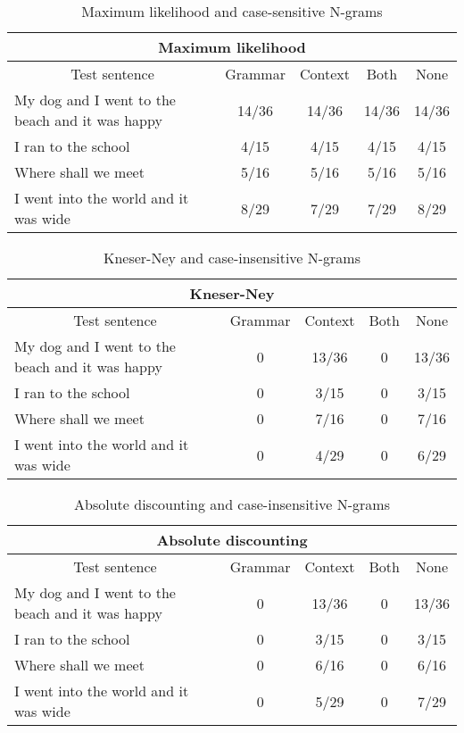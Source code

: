 \vspace{-1cm}
\begin{table}[H]
\centering
\caption{Maximum likelihood and case-sensitive N-grams}
{\scriptsize
\begin{tabular}{ |p{}|c|c|c|c| }
	\hline
	\multicolumn{5}{|c|}{Maximum likelihood} \\
	\hline
	\multicolumn{1}{|c|}{Test sentence} & Grammar & Context & Both & None \\
	\hline
	My dog and I went to the beach and it was happy & 14/36 & 14/36 & 14/36 & 14/36 \\
	\hline
	I ran to the school & 4/15 & 4/15 & 4/15 & 4/15 \\
	\hline
	Where shall we meet & 5/16 & 5/16 & 5/16 & 5/16 \\
	\hline
	I went into the world and it was wide & 8/29 & 7/29 & 7/29 & 8/29 \\
	\hline
\end{tabular}
}
\end{table}
\vspace{-1cm}



\begin{table}[H]
\centering
\caption{Kneser-Ney and case-insensitive N-grams}
{\scriptsize
\begin{tabular}{ |p{}|c|c|c|c| }
	\hline
	\multicolumn{5}{|c|}{Kneser-Ney} \\
	\hline
	\multicolumn{1}{|c|}{Test sentence} & Grammar & Context & Both & None \\
	\hline
	My dog and I went to the beach and it was happy & 0 & 13/36 & 0 & 13/36 \\
	\hline
	I ran to the school & 0 & 3/15 & 0 & 3/15 \\
	\hline
	Where shall we meet & 0 & 7/16 & 0 & 7/16 \\
	\hline
	I went into the world and it was wide & 0 & 4/29 & 0 & 6/29 \\
	\hline
\end{tabular}
}
\end{table}

\vspace{-1cm}
\begin{table}[H]
\centering
\caption{Absolute discounting and case-insensitive N-grams}
{\scriptsize
\begin{tabular}{ |p{}|c|c|c|c| }
	\hline
	\multicolumn{5}{|c|}{Absolute discounting} \\
	\hline
	\multicolumn{1}{|c|}{Test sentence} & Grammar & Context & Both & None \\
	\hline
	My dog and I went to the beach and it was happy & 0 & 13/36 & 0 & 13/36 \\
	\hline
	I ran to the school & 0 & 3/15 & 0 & 3/15 \\
	\hline
	Where shall we meet & 0 & 6/16 & 0 & 6/16 \\
	\hline
	I went into the world and it was wide & 0 & 5/29 & 0 & 7/29 \\
	\hline
\end{tabular}
}
\end{table}

